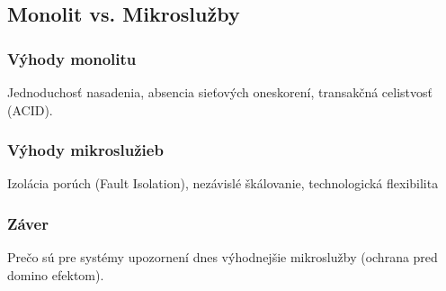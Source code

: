 \documentclass[../../../thesis.tex]{subfiles}
\begin{document}
    \subsection{Monolit vs. Mikroslužby}

    \subsubsection*{Výhody monolitu}
    Jednoduchosť nasadenia, absencia sieťových oneskorení, transakčná celistvosť (ACID).

    \subsubsection*{Výhody mikroslužieb}
    Izolácia porúch (Fault Isolation), nezávislé škálovanie, technologická flexibilita

    \subsubsection*{Záver}
    Prečo sú pre systémy upozornení dnes výhodnejšie mikroslužby (ochrana pred domino efektom).
\end{document}
